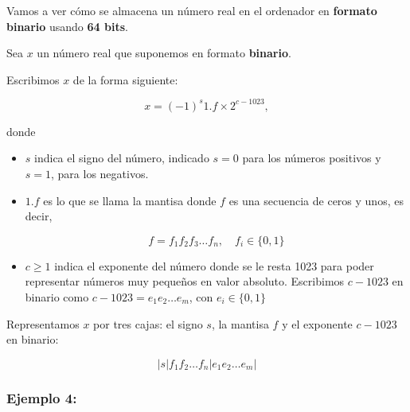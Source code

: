 \documentclass[
]{article}
\providecommand{\tightlist}{%
  \setlength{\itemsep}{0pt}\setlength{\parskip}{0pt}}
\begin{document}
Vamos a ver cómo se almacena un número real en el ordenador en
\textbf{formato binario} usando \textbf{64 bits}.

Sea \(x\) un número real que suponemos en formato \textbf{binario}.

Escribimos \(x\) de la forma siguiente:

\[
x=(−1)^s 1.f\times2^{c−1023},
\]

donde

\begin{itemize}
\tightlist
\item
  \(s\) indica el signo del número, indicado \(s=0\) para los números
  positivos y \(s=1\), para los negativos.
\item
  \(1.f\) es lo que se llama la mantisa donde \(f\) es una secuencia de
  ceros y unos, es decir,

  \[
  f= f_1f_2f_3\ldots f_n, \quad f_i \in \{0,1\}
  \]
\item
  \(c \geq 1\) indica el exponente del número donde se le resta 1023
  para poder representar números muy pequeños en valor absoluto.
  Escribimos \(c−1023\) en binario como \(c−1023=e_1e_2\ldots e_m\), con
  \(e_i \in \{0,1\}\)
\end{itemize}

Representamos \(x\) por tres cajas: el signo \(s\), la mantisa \(f\) y
el exponente \(c−1023\) en binario:

\[
|s| f_1f_2\ldots f_n| e_1e_2\ldots e_m|
\]

\subsubsection{Ejemplo 4:}\label{ejemplo-4}
\end{document}
